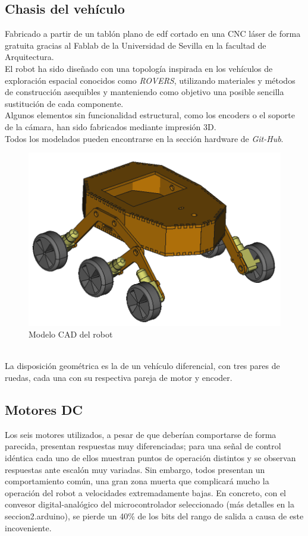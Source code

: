 \subsection{Chasis del vehículo}
Fabricado a partir de un tablón plano de edf cortado en una CNC láser de forma gratuita gracias al Fablab de la Universidad de Sevilla en la facultad de Arquitectura. \\
El robot ha sido diseñado con una topología inspirada en los vehículos de exploración espacial conocidos como \textit{ROVERS}, utilizando materiales y métodos de construcción asequibles y
manteniendo como objetivo una posible sencilla sustitución de cada componente. \\
Algunos elementos sin funcionalidad estructural, como los encoders o el soporte de la cámara, han sido fabricados mediante impresión 3D. \\
Todos los modelados pueden encontrarse en la sección hardware de \textit{Git-Hub}.
\begin{figure}[h!]
	\centering
	\includegraphics[width=.5\textwidth]{images/hw/wheele_stl}
	\caption{Modelo CAD del robot}
\end{figure}
\\
La disposición geométrica es la de un vehículo diferencial, con tres pares de ruedas, cada una con su respectiva pareja de motor y encoder.\\

\subsection{Motores DC}
 Los seis motores utilizados, a pesar de que deberían comportarse de forma parecida, presentan respuestas muy diferenciadas; para una señal de control idéntica cada uno de ellos muestran puntos de operación distintos y se observan respuestas ante escalón muy variadas. Sin embargo, 
 todos presentan un comportamiento común, una gran zona muerta que complicará mucho la operación del robot a velocidades extremadamente bajas. En concreto, con el convesor digital-analógico del microcontrolador seleccionado (más detalles en la seccion2.arduino), se pierde un 40\% de los bits del rango de salida a causa de este incoveniente.  
